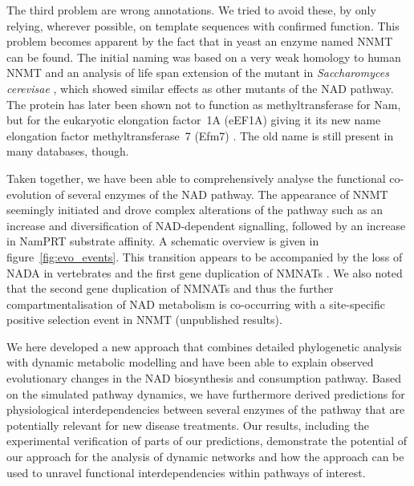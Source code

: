 The third problem are wrong annotations. We tried to avoid these, by only relying, wherever possible,  on template sequences with confirmed function. This problem becomes apparent by the fact that in yeast an enzyme named NNMT can be found. The initial naming was based on a very weak homology to human NNMT and an analysis of life span extension of the mutant in \textit{Saccharomyces cerevisae} \citep{Anderson2003}, which showed similar effects as other mutants of the NAD pathway. The protein has later been shown not to function as methyltransferase for Nam, but for the eukaryotic elongation factor~1A (eEF1A) giving it its new name elongation factor methyltransferase~7 (Efm7) \citep{Hamey2016}. The old name is still present in many databases, though.

Taken together, we have been able to comprehensively analyse the functional co-evolution of several enzymes of the NAD pathway. The appearance of NNMT seemingly initiated and drove complex alterations of the pathway such as an increase and diversification of NAD-dependent signalling, followed by an increase in NamPRT substrate affinity. A schematic overview is given in figure~\ref{fig:evo_events}. This transition appears to be accompanied by the loss of NADA in vertebrates and the first gene duplication of NMNATs \citep{Lau2010}. We also noted that the second gene duplication of NMNATs and thus the further compartmentalisation of NAD metabolism is co-occurring with a site-specific positive selection event in NNMT (unpublished results).

We here developed a new approach that combines detailed phylogenetic analysis with dynamic metabolic modelling and have been able to explain observed evolutionary changes in the NAD biosynthesis and consumption pathway. Based on the simulated pathway dynamics, we have furthermore derived predictions for physiological interdependencies between several enzymes of the pathway that are potentially relevant for new disease treatments. Our results, including the experimental verification of parts of our predictions, demonstrate the potential of our approach for the analysis of dynamic networks and how the approach can be used to unravel functional interdependencies within pathways of interest.
